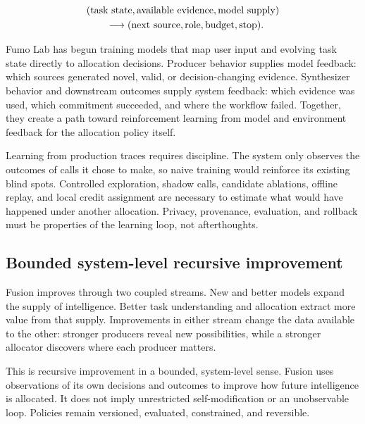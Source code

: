 \begin{align}
 &(\text{task state},\text{available evidence},\text{model supply}) \notag\\
 &\hspace{2.0em}\longrightarrow
 (\text{next source},\text{role},\text{budget},\text{stop}).
\end{align}

Fumo Lab has begun training models that map user input and evolving task state
directly to allocation decisions. Producer behavior supplies model feedback:
which sources generated novel, valid, or decision-changing evidence.
Synthesizer behavior and downstream outcomes supply system feedback: which
evidence was used, which commitment succeeded, and where the workflow failed.
Together, they create a path toward reinforcement learning from model and
environment feedback for the allocation policy itself.

Learning from production traces requires discipline. The system only observes
the outcomes of calls it chose to make, so naive training would reinforce its
existing blind spots. Controlled exploration, shadow calls, candidate
ablations, offline replay, and local credit assignment are necessary to
estimate what would have happened under another allocation. Privacy,
provenance, evaluation, and rollback must be properties of the learning loop,
not afterthoughts.

\subsection{Bounded system-level recursive improvement}

Fusion improves through two coupled streams. New and better models expand the
supply of intelligence. Better task understanding and allocation extract more
value from that supply. Improvements in either stream change the data available
to the other: stronger producers reveal new possibilities, while a stronger
allocator discovers where each producer matters.

This is recursive improvement in a bounded, system-level sense. Fusion uses
observations of its own decisions and outcomes to improve how future
intelligence is allocated. It does not imply unrestricted self-modification or
an unobservable loop. Policies remain versioned, evaluated, constrained, and
reversible.

